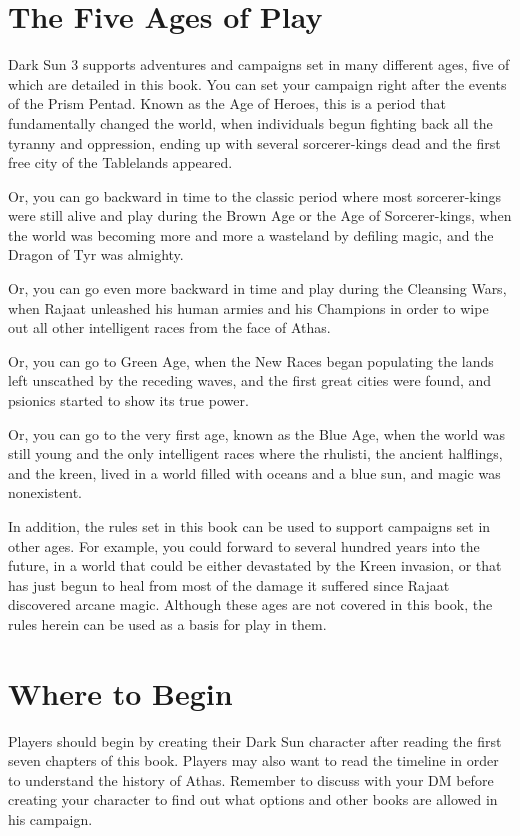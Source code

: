 \section{The Five Ages of Play}
{\tableheader Dark Sun} 3 supports adventures and campaigns set in many different ages, five of which are detailed in this book. You can set your campaign right after the events of the Prism Pentad. Known as the Age of Heroes, this is a period that fundamentally changed the world, when individuals begun fighting back all the tyranny and oppression, ending up with several sorcerer-kings dead and the first free city of the Tablelands appeared.

Or, you can go backward in time to the classic period where most sorcerer-kings were still alive and play during the Brown Age or the Age of Sorcerer-kings, when the world was becoming more and more a wasteland by defiling magic, and the Dragon of Tyr was almighty.

Or, you can go even more backward in time and play during the Cleansing Wars, when Rajaat unleashed his human armies and his Champions in order to wipe out all other intelligent races from the face of Athas.

Or, you can go to Green Age, when the New Races began populating the lands left unscathed by the receding waves, and the first great cities were found, and psionics started to show its true power.

Or, you can go to the very first age, known as the Blue Age, when the world was still young and the only intelligent races where the rhulisti, the ancient halflings, and the kreen, lived in a world filled with oceans and a blue sun, and magic was nonexistent.

In addition, the rules set in this book can be used to support campaigns set in other ages. For example, you could forward to several hundred years into the future, in a world that could be either devastated by the Kreen invasion, or that has just begun to heal from most of the damage it suffered since Rajaat discovered arcane magic. Although these ages are not covered in this book, the rules herein can be used as a basis for play in them.

\section{Where to Begin}
Players should begin by creating their {\tableheader Dark Sun} character after reading the first seven chapters of this book. Players may also want to read the timeline in order to understand the history of Athas. Remember to discuss with your DM before creating your character to find out what options and other books are allowed in his campaign.

